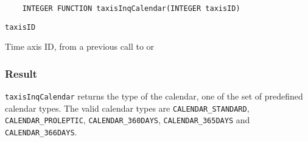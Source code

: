 \begin{verbatim}
    INTEGER FUNCTION taxisInqCalendar(INTEGER taxisID)
\end{verbatim}

\hspace*{4mm}\begin{minipage}[]{15cm}
\begin{deflist}{\tt taxisID\ }
\item[{\tt taxisID}]
Time axis ID, from a previous call to {} or {}

\end{deflist}
\end{minipage}

\subsubsection*{Result}

{\tt taxisInqCalendar} returns the type of the calendar,
one of the set of predefined {\CDI} calendar types.
The valid {\CDI} calendar types are {\tt CALENDAR\_STANDARD}, {\tt CALENDAR\_PROLEPTIC},
{\tt CALENDAR\_360DAYS}, {\tt CALENDAR\_365DAYS} and {\tt CALENDAR\_366DAYS}.

